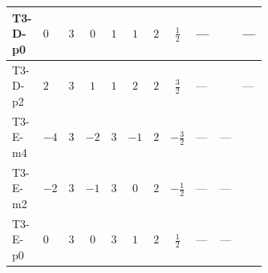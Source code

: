 \documentclass[8pt]{article}
\begin{document}
\begin{landscape}
\begin{longtable}{@{}llcccccc >{\raggedright\arraybackslash}p{0.21\linewidth} >{\raggedright\arraybackslash}p{0.21\linewidth} >{\raggedright\arraybackslash}p{0.21\linewidth}@{}}
\midrule
T3-D-p0 & $0$ & $3$ & $0$ & $1$ & $1$ & $2$ & $\frac{1}{2}$ & --- & \scriptsize\adjustbox{max width=\linewidth}{$\begin{gathered} {\lambda_5} (T_{\nu}^{(1)}+2 T_{\nu}^{(2)}+6 \operatorname{Tr}\!\left({Y_d}\,\left({Y_d}\right)^{\dagger}\right)+2 \operatorname{Tr}\!\left({Y_e}\,\left({Y_e}\right)^{\dagger}\right)+6 \operatorname{Tr}\!\left({Y_u}\,\left({Y_u}\right)^{\dagger}\right)-4 {\lambda_{HS_1}^{(A)}})\end{gathered}$} & --- \\
\midrule
T3-D-p2 & $2$ & $3$ & $1$ & $1$ & $2$ & $2$ & $\frac{3}{2}$ & --- & \scriptsize\adjustbox{max width=\linewidth}{$\begin{gathered} {\lambda_5} (T_{\nu}^{(1)}+2 T_{\nu}^{(2)}+6 \operatorname{Tr}\!\left({Y_d}\,\left({Y_d}\right)^{\dagger}\right)+2 \operatorname{Tr}\!\left({Y_e}\,\left({Y_e}\right)^{\dagger}\right)+6 \operatorname{Tr}\!\left({Y_u}\,\left({Y_u}\right)^{\dagger}\right)-4 {\lambda_{HS_1}^{(A)}})\end{gathered}$} & --- \\
\midrule
T3-E-m4 & $-4$ & $3$ & $-2$ & $3$ & $-1$ & $2$ & $-\frac{3}{2}$ & --- & --- & \scriptsize\adjustbox{max width=\linewidth}{$\begin{gathered} {\lambda_5} \left(T_{\nu}^{(1)}+T_{\nu}^{(2)}+6 \operatorname{Tr}\!\left({Y_d}\,\left({Y_d}\right)^{\dagger}\right)+2 \operatorname{Tr}\!\left({Y_e}\,\left({Y_e}\right)^{\dagger}\right)+6 \operatorname{Tr}\!\left({Y_u}\,\left({Y_u}\right)^{\dagger}\right)-\frac{4 {\lambda_{12}^{(A)}}}{3}-2 {\lambda_{12}^{(\times)}}-2 {\lambda_{HS_1}^{(A)}}-\frac{4 {\lambda_{HS_2}^{(A)}}}{3}\right)\end{gathered}$} \\
\midrule
T3-E-m2 & $-2$ & $3$ & $-1$ & $3$ & $0$ & $2$ & $-\frac{1}{2}$ & --- & --- & \scriptsize\adjustbox{max width=\linewidth}{$\begin{gathered} {\lambda_5} \left(T_{\nu}^{(1)}+T_{\nu}^{(2)}+6 \operatorname{Tr}\!\left({Y_d}\,\left({Y_d}\right)^{\dagger}\right)+2 \operatorname{Tr}\!\left({Y_e}\,\left({Y_e}\right)^{\dagger}\right)+6 \operatorname{Tr}\!\left({Y_u}\,\left({Y_u}\right)^{\dagger}\right)-\frac{4 {\lambda_{12}^{(A)}}}{3}-2 {\lambda_{12}^{(\times)}}-2 {\lambda_{HS_1}^{(A)}}-\frac{4 {\lambda_{HS_2}^{(A)}}}{3}\right)\end{gathered}$} \\
\midrule
T3-E-p0 & $0$ & $3$ & $0$ & $3$ & $1$ & $2$ & $\frac{1}{2}$ & --- & --- & \scriptsize\adjustbox{max width=\linewidth}{$\begin{gathered} {\lambda_5} \left(T_{\nu}^{(1)}+T_{\nu}^{(2)}+6 \operatorname{Tr}\!\left({Y_d}\,\left({Y_d}\right)^{\dagger}\right)+2 \operatorname{Tr}\!\left({Y_e}\,\left({Y_e}\right)^{\dagger}\right)+6 \operatorname{Tr}\!\left({Y_u}\,\left({Y_u}\right)^{\dagger}\right)-\frac{4 {\lambda_{12}^{(A)}}}{3}-2 {\lambda_{12}^{(\times)}}-2 {\lambda_{HS_1}^{(A)}}-\frac{4 {\lambda_{HS_2}^{(A)}}}{3}\right)\end{gathered}$} \\

\end{longtable}
\end{landscape}
\end{document}
